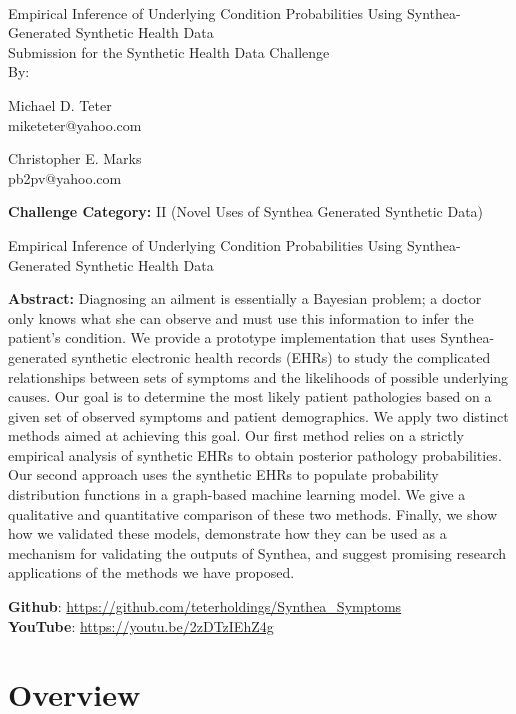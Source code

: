 \documentclass[11pt]{article}
\newcommand{\solutiontitle}{Empirical Inference of Underlying Condition Probabilities Using Synthea-Generated Synthetic Health Data}
\newcommand{\challengecategory}{II (Novel Uses of Synthea Generated Synthetic Data)}
\newcommand{\ABSTRACT}{Diagnosing an ailment is essentially a Bayesian problem; a doctor only knows what she can observe and must use this information to infer the patient's condition.  We provide a prototype implementation that uses Synthea-generated synthetic electronic health records (EHRs) to study the complicated relationships between sets of symptoms and the likelihoods of possible underlying causes.  Our goal is to determine the most likely patient pathologies based on a given set of observed symptoms and patient demographics. We apply two distinct methods aimed at achieving this goal.  Our first method relies on a strictly empirical analysis of synthetic EHRs to obtain posterior pathology probabilities.  Our second approach uses the synthetic EHRs to populate probability distribution functions in a graph-based machine learning model.  We give a qualitative and quantitative comparison of these two methods.  Finally, we show how we validated these models, demonstrate how they can be used as a mechanism for validating the outputs of Synthea, and suggest promising research applications of the methods we have proposed.
}
\begin{document}

\thispagestyle{empty}

~

\begin{center}
    {\huge \solutiontitle} \\[24pt]
    {\Large Submission for the Synthetic Health Data Challenge} \\[24pt]
    {\Large By:} \\[24pt]
\end{center}

\begin{multicols}{2}
\begin{center}
	Michael D. Teter\\
	miketeter@yahoo.com
\end{center}

\columnbreak

\begin{center}
    Christopher E. Marks\\
    pb2pv@yahoo.com
\end{center}
\end{multicols}



\noindent \textbf{Challenge Category:} \challengecategory
\\


\clearpage


\setcounter{page}{1}

\begin{center}
  {\LARGE \solutiontitle}
  \\[11pt]
  \begin{minipage}{0.9\textwidth}
    \textbf{Abstract:}
    \ABSTRACT
  \end{minipage}
\end{center}
\vspace{11pt}

\noindent \textbf{Github}: \url{https://github.com/teterholdings/Synthea_Symptoms}\\
\noindent \textbf{YouTube}: \url{https://youtu.be/2zDTzIEhZ4g}

\section{Overview} \label{sec: overview}
\end{document}
